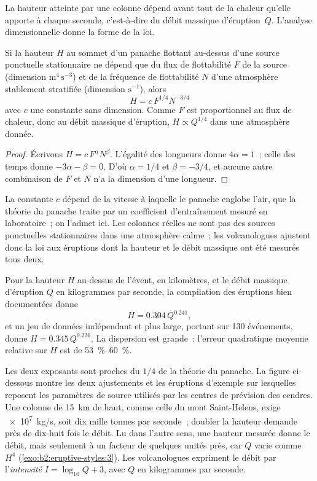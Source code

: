 La hauteur atteinte par une colonne dépend avant tout de la chaleur qu'elle apporte à chaque
seconde, c'est-à-dire du débit massique d'éruption~$Q$. L'analyse dimensionnelle donne la
forme de la loi.

\begin{proposition}\label{prop:b2:eruptive-styles:plume}
Si la hauteur $H$ au sommet d'un panache flottant au-dessus d'une source ponctuelle stationnaire ne dépend que
du flux de flottabilité $F$ de la source (dimension $\mathrm{m^4\,s^{-3}}$) et de la fréquence de
flottabilité $N$ d'une atmosphère stablement stratifiée (dimension
$\mathrm{s^{-1}}$), alors
\[
H = c\,F^{1/4}N^{-3/4}
\]
avec $c$ une constante sans dimension. Comme $F$ est proportionnel au flux de chaleur, donc
au débit massique d'éruption, $H \propto Q^{1/4}$ dans une atmosphère donnée.
\end{proposition}

\begin{proof}
Écrivons $H = c\,F^{\alpha}N^{\beta}$. L'égalité des longueurs donne $4\alpha = 1$~; celle des
temps donne $-3\alpha - \beta = 0$. D'où $\alpha = 1/4$ et $\beta = -3/4$, et aucune autre
combinaison de $F$ et $N$ n'a la dimension d'une longueur.
\end{proof}

La constante $c$ dépend de la vitesse à laquelle le panache englobe l'air, que la théorie du
panache traite par un coefficient d'entraînement mesuré en laboratoire~; on l'admet
ici. Les colonnes réelles ne sont pas des sources ponctuelles stationnaires dans une atmosphère calme~; les
volcanologues ajustent donc la loi aux éruptions dont la hauteur et le débit massique ont été
mesurés tous deux.

\begin{proposition}\label{prop:b2:eruptive-styles:mastin}
Pour la hauteur $H$ au-dessus de l'évent, en kilomètres, et le débit massique d'éruption
$Q$ en kilogrammes par seconde, la compilation des éruptions bien documentées donne
\[
H = 0.304\,Q^{0.241},
\]
et un jeu de données indépendant et plus large, portant sur 130 événements, donne $H = 0.345\,Q^{0.226}$.
La dispersion est grande~: l'erreur quadratique moyenne relative sur $H$ est de
\qtyrange{53}{60}{\percent}.
\end{proposition}
\admitted

Les deux exposants sont proches du $1/4$ de la théorie du panache. La figure ci-dessous montre
les deux ajustements et les éruptions d'exemple sur lesquelles reposent les paramètres de source utilisés par
les centres de prévision des cendres. Une colonne de \qty{15}{km} de haut, comme celle du mont
Saint-Helens, exige \qty{e7}{kg/s}, soit dix mille tonnes par seconde~; doubler la
hauteur demande près de dix-huit fois le débit. Lu dans l'autre sens, une hauteur mesurée donne
le débit, mais seulement à un facteur de quelques unités près, car $Q$ varie comme $H^4$
(\cref{exo:b2:eruptive-styles:3}). Les volcanologues expriment le débit par l'\emph{intensité} $I =
\log_{10}Q + 3$, avec $Q$ en kilogrammes par seconde.


